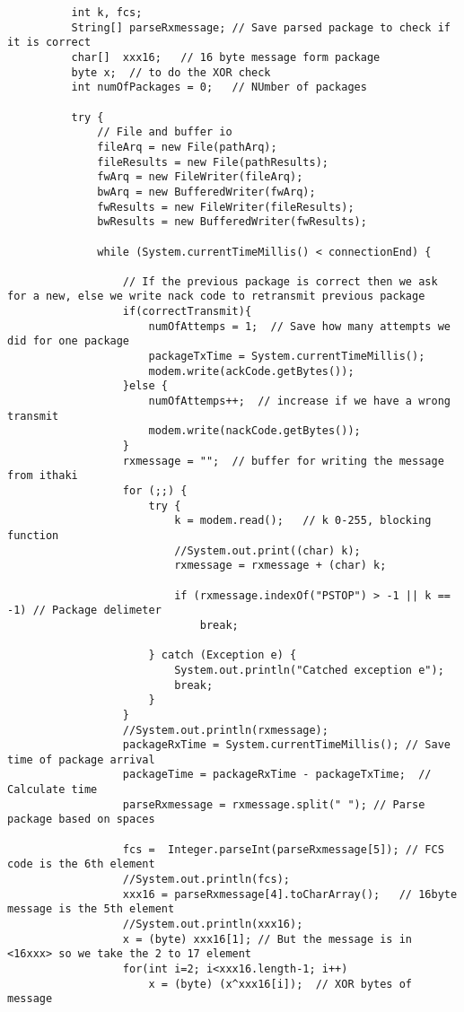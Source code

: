 \documentclass[10pt,a4paper]{article}
\begin{document}
\begin{lstlisting}
          int k, fcs;
          String[] parseRxmessage; // Save parsed package to check if it is correct
          char[]  xxx16;   // 16 byte message form package
          byte x;  // to do the XOR check
          int numOfPackages = 0;   // NUmber of packages
  
          try {
              // File and buffer io
              fileArq = new File(pathArq);
              fileResults = new File(pathResults);
              fwArq = new FileWriter(fileArq);
              bwArq = new BufferedWriter(fwArq);
              fwResults = new FileWriter(fileResults);
              bwResults = new BufferedWriter(fwResults);
  
              while (System.currentTimeMillis() < connectionEnd) {
  
                  // If the previous package is correct then we ask for a new, else we write nack code to retransmit previous package
                  if(correctTransmit){
                      numOfAttemps = 1;  // Save how many attempts we did for one package
                      packageTxTime = System.currentTimeMillis();
                      modem.write(ackCode.getBytes());
                  }else {
                      numOfAttemps++;  // increase if we have a wrong transmit
                      modem.write(nackCode.getBytes());
                  }
                  rxmessage = "";  // buffer for writing the message from ithaki
                  for (;;) {
                      try {
                          k = modem.read();   // k 0-255, blocking function
                          //System.out.print((char) k);
                          rxmessage = rxmessage + (char) k;
  
                          if (rxmessage.indexOf("PSTOP") > -1 || k == -1) // Package delimeter
                              break;
  
                      } catch (Exception e) {
                          System.out.println("Catched exception e");
                          break;
                      }
                  }
                  //System.out.println(rxmessage);
                  packageRxTime = System.currentTimeMillis(); // Save time of package arrival
                  packageTime = packageRxTime - packageTxTime;  // Calculate time
                  parseRxmessage = rxmessage.split(" "); // Parse package based on spaces
  
                  fcs =  Integer.parseInt(parseRxmessage[5]); // FCS code is the 6th element
                  //System.out.println(fcs);
                  xxx16 = parseRxmessage[4].toCharArray();   // 16byte message is the 5th element
                  //System.out.println(xxx16);
                  x = (byte) xxx16[1]; // But the message is in <16xxx> so we take the 2 to 17 element
                  for(int i=2; i<xxx16.length-1; i++)
                      x = (byte) (x^xxx16[i]);  // XOR bytes of message
  

\end{lstlisting}
\end{document}
